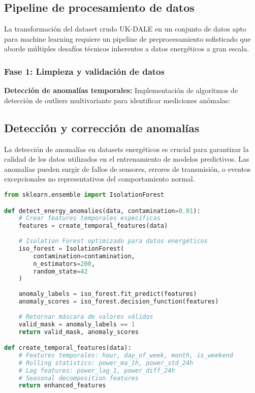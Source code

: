 \subsection{Pipeline de procesamiento de datos}

La transformación del dataset crudo UK-DALE en un conjunto de datos apto para machine learning requiere un pipeline de preprocesamiento sofisticado que aborde múltiples desafíos técnicos inherentes a datos energéticos a gran escala.

\subsubsection{Fase 1: Limpieza y validación de datos}

\textbf{Detección de anomalías temporales:}
Implementación de algoritmos de detección de outliers multivariante para identificar mediciones anómalas:

\subsection{Detección y corrección de anomalías}

La detección de anomalías en datasets energéticos es crucial para garantizar la calidad de los datos utilizados en el entrenamiento de modelos predictivos. Las anomalías pueden surgir de fallos de sensores, errores de transmisión, o eventos excepcionales no representativos del comportamiento normal.

\begin{lstlisting}[language=Python, caption=Sistema de detección de anomalías]
from sklearn.ensemble import IsolationForest

def detect_energy_anomalies(data, contamination=0.01):
    # Crear features temporales específicas
    features = create_temporal_features(data)
    
    # Isolation Forest optimizado para datos energéticos
    iso_forest = IsolationForest(
        contamination=contamination,
        n_estimators=200,
        random_state=42
    )
    
    anomaly_labels = iso_forest.fit_predict(features)
    anomaly_scores = iso_forest.decision_function(features)
    
    # Retornar máscara de valores válidos
    valid_mask = anomaly_labels == 1
    return valid_mask, anomaly_scores

def create_temporal_features(data):
    # Features temporales: hour, day_of_week, month, is_weekend
    # Rolling statistics: power_ma_1h, power_std_24h
    # Lag features: power_lag_1, power_diff_24h
    # Seasonal decomposition features
    return enhanced_features
\end{lstlisting}

